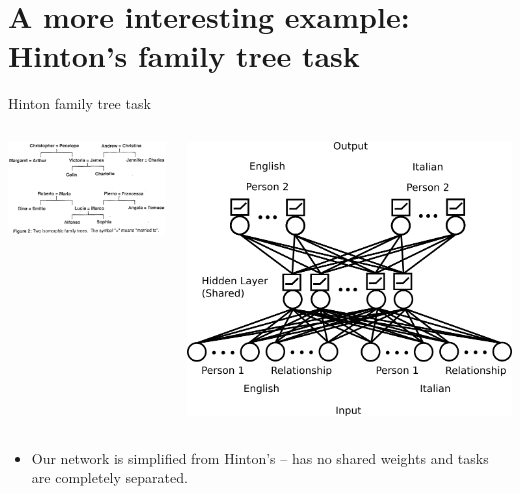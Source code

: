 \documentclass{beamer}
\begin{document}
\section{A more interesting example: Hinton's family tree task}
\begin{frame}{Hinton family tree task}
\begin{columns}
    \begin{center}
	\includegraphics[width = \textwidth]{../writing/cogsci_2017/figures/hinton_family_tree_figure.png}
    \end{center}
     {
    \begin{center}
	\includegraphics[width = \textwidth]{../writing/cogsci_2017/figures/family_tree_network_diagram.png}
    \end{center}
    }
\end{columns}
 {
\begin{itemize}
\item Our network is simplified from Hinton's -- has no shared weights and tasks are completely separated.
\end{itemize}
}
\end{frame}
\end{document}
